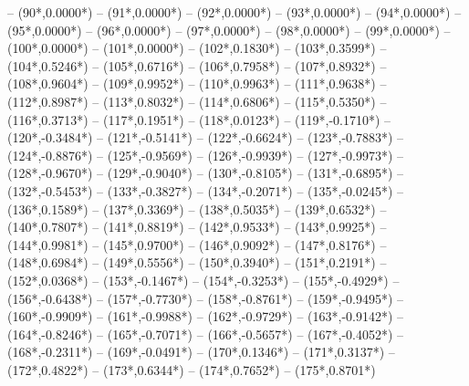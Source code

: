 {		-- ({90*\dx},{0.0000*\dy})
		-- ({91*\dx},{0.0000*\dy})
		-- ({92*\dx},{0.0000*\dy})
		-- ({93*\dx},{0.0000*\dy})
		-- ({94*\dx},{0.0000*\dy})
		-- ({95*\dx},{0.0000*\dy})
		-- ({96*\dx},{0.0000*\dy})
		-- ({97*\dx},{0.0000*\dy})
		-- ({98*\dx},{0.0000*\dy})
		-- ({99*\dx},{0.0000*\dy})
		-- ({100*\dx},{0.0000*\dy})
		-- ({101*\dx},{0.0000*\dy})
		-- ({102*\dx},{0.1830*\dy})
		-- ({103*\dx},{0.3599*\dy})
		-- ({104*\dx},{0.5246*\dy})
		-- ({105*\dx},{0.6716*\dy})
		-- ({106*\dx},{0.7958*\dy})
		-- ({107*\dx},{0.8932*\dy})
		-- ({108*\dx},{0.9604*\dy})
		-- ({109*\dx},{0.9952*\dy})
		-- ({110*\dx},{0.9963*\dy})
		-- ({111*\dx},{0.9638*\dy})
		-- ({112*\dx},{0.8987*\dy})
		-- ({113*\dx},{0.8032*\dy})
		-- ({114*\dx},{0.6806*\dy})
		-- ({115*\dx},{0.5350*\dy})
		-- ({116*\dx},{0.3713*\dy})
		-- ({117*\dx},{0.1951*\dy})
		-- ({118*\dx},{0.0123*\dy})
		-- ({119*\dx},{-0.1710*\dy})
		-- ({120*\dx},{-0.3484*\dy})
		-- ({121*\dx},{-0.5141*\dy})
		-- ({122*\dx},{-0.6624*\dy})
		-- ({123*\dx},{-0.7883*\dy})
		-- ({124*\dx},{-0.8876*\dy})
		-- ({125*\dx},{-0.9569*\dy})
		-- ({126*\dx},{-0.9939*\dy})
		-- ({127*\dx},{-0.9973*\dy})
		-- ({128*\dx},{-0.9670*\dy})
		-- ({129*\dx},{-0.9040*\dy})
		-- ({130*\dx},{-0.8105*\dy})
		-- ({131*\dx},{-0.6895*\dy})
		-- ({132*\dx},{-0.5453*\dy})
		-- ({133*\dx},{-0.3827*\dy})
		-- ({134*\dx},{-0.2071*\dy})
		-- ({135*\dx},{-0.0245*\dy})
		-- ({136*\dx},{0.1589*\dy})
		-- ({137*\dx},{0.3369*\dy})
		-- ({138*\dx},{0.5035*\dy})
		-- ({139*\dx},{0.6532*\dy})
		-- ({140*\dx},{0.7807*\dy})
		-- ({141*\dx},{0.8819*\dy})
		-- ({142*\dx},{0.9533*\dy})
		-- ({143*\dx},{0.9925*\dy})
		-- ({144*\dx},{0.9981*\dy})
		-- ({145*\dx},{0.9700*\dy})
		-- ({146*\dx},{0.9092*\dy})
		-- ({147*\dx},{0.8176*\dy})
		-- ({148*\dx},{0.6984*\dy})
		-- ({149*\dx},{0.5556*\dy})
		-- ({150*\dx},{0.3940*\dy})
		-- ({151*\dx},{0.2191*\dy})
		-- ({152*\dx},{0.0368*\dy})
		-- ({153*\dx},{-0.1467*\dy})
		-- ({154*\dx},{-0.3253*\dy})
		-- ({155*\dx},{-0.4929*\dy})
		-- ({156*\dx},{-0.6438*\dy})
		-- ({157*\dx},{-0.7730*\dy})
		-- ({158*\dx},{-0.8761*\dy})
		-- ({159*\dx},{-0.9495*\dy})
		-- ({160*\dx},{-0.9909*\dy})
		-- ({161*\dx},{-0.9988*\dy})
		-- ({162*\dx},{-0.9729*\dy})
		-- ({163*\dx},{-0.9142*\dy})
		-- ({164*\dx},{-0.8246*\dy})
		-- ({165*\dx},{-0.7071*\dy})
		-- ({166*\dx},{-0.5657*\dy})
		-- ({167*\dx},{-0.4052*\dy})
		-- ({168*\dx},{-0.2311*\dy})
		-- ({169*\dx},{-0.0491*\dy})
		-- ({170*\dx},{0.1346*\dy})
		-- ({171*\dx},{0.3137*\dy})
		-- ({172*\dx},{0.4822*\dy})
		-- ({173*\dx},{0.6344*\dy})
		-- ({174*\dx},{0.7652*\dy})
		-- ({175*\dx},{0.8701*\dy})
}

